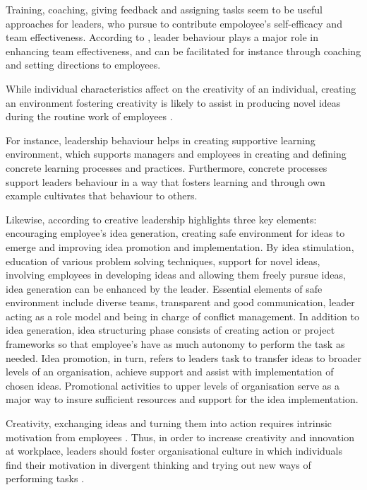 Training, coaching, giving feedback and assigning tasks seem to be useful approaches for leaders, who pursue to contribute empoloyee's self-efficacy and team effectiveness\citep{amabile1998kill}. According to \citet{hackman1987design}, leader behaviour plays a major role in enhancing team effectiveness, and can be facilitated for instance through coaching and setting directions to employees. 

While individual characteristics affect on the creativity of an individual, creating an environment fostering creativity is likely to assist in producing novel ideas during the routine work of employees \citep{amabile1996assessing}. 

For instance, leadership behaviour helps in creating supportive learning environment, which supports managers and employees in creating and defining concrete learning processes and practices. Furthermore, concrete processes support leaders behaviour in a way that fosters learning and through own example cultivates that behaviour to others. \citep{garvin2008yours}

Likewise, according to \citet{mumford2002leading} creative leadership highlights three key elements: encouraging employee's idea generation, creating safe environment for ideas to emerge and improving idea promotion and implementation. By idea stimulation, education of various problem solving techniques, support for novel ideas, involving employees in developing ideas and allowing them freely pursue ideas, idea generation can be enhanced by the leader. Essential elements of safe environment include diverse teams, transparent and good communication, leader acting as a role model and being in charge of conflict management. In addition to idea generation, idea structuring phase consists of creating action or project frameworks so that employee's have as much autonomy to perform the task as needed. Idea promotion, in turn, refers to leaders task to transfer ideas to broader levels of an organisation, achieve support and assist with implementation of chosen ideas. Promotional activities to upper levels of organisation serve as a major way to insure sufficient resources and support for the idea implementation. \citep{mumford2002leading} 

Creativity, exchanging ideas and turning them into action requires intrinsic motivation from employees \citep{jung2001transformational}. Thus, in order to increase creativity and innovation at workplace, leaders should foster organisational culture in which individuals find their motivation in divergent thinking and trying out new ways of performing tasks \citep{amabile1998kill}. 

